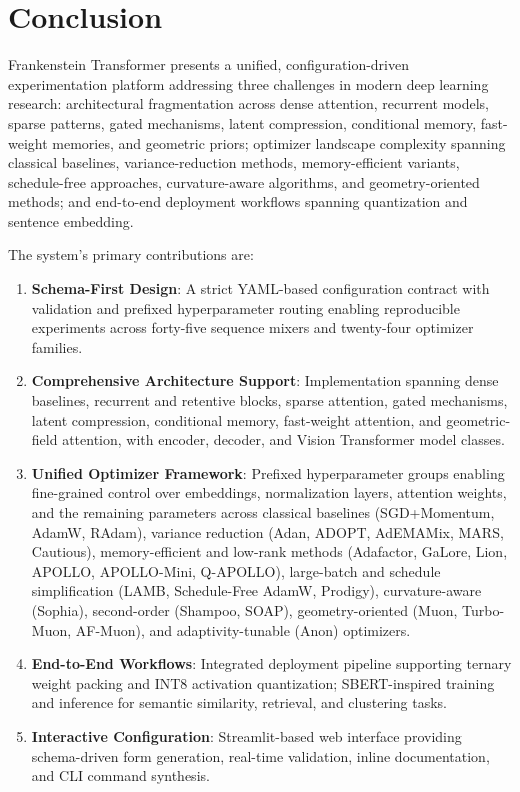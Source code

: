 \section{Conclusion}
\label{sec:conclusion}

Frankenstein Transformer presents a unified, configuration-driven experimentation platform addressing three challenges in modern deep learning research: architectural fragmentation across dense attention, recurrent models, sparse patterns, gated mechanisms, latent compression, conditional memory, fast-weight memories, and geometric priors; optimizer landscape complexity spanning classical baselines, variance-reduction methods, memory-efficient variants, schedule-free approaches, curvature-aware algorithms, and geometry-oriented methods; and end-to-end deployment workflows spanning quantization and sentence embedding.

The system's primary contributions are:
\begin{enumerate}[leftmargin=*]
    \item \textbf{Schema-First Design}: A strict YAML-based configuration contract with validation and prefixed hyperparameter routing enabling reproducible experiments across forty-five sequence mixers and twenty-four optimizer families.
    \item \textbf{Comprehensive Architecture Support}: Implementation spanning dense baselines, recurrent and retentive blocks, sparse attention, gated mechanisms, latent compression, conditional memory, fast-weight attention, and geometric-field attention, with encoder, decoder, and Vision Transformer model classes.
    \item \textbf{Unified Optimizer Framework}: Prefixed hyperparameter groups enabling fine-grained control over embeddings, normalization layers, attention weights, and the remaining parameters across classical baselines (SGD+Momentum, AdamW, RAdam), variance reduction (Adan, ADOPT, AdEMAMix, MARS, Cautious), memory-efficient and low-rank methods (Adafactor, GaLore, Lion, APOLLO, APOLLO-Mini, Q-APOLLO), large-batch and schedule simplification (LAMB, Schedule-Free AdamW, Prodigy), curvature-aware (Sophia), second-order (Shampoo, SOAP), geometry-oriented (Muon, Turbo-Muon, AF-Muon), and adaptivity-tunable (Anon) optimizers.
    \item \textbf{End-to-End Workflows}: Integrated deployment pipeline supporting ternary weight packing and INT8 activation quantization; SBERT-inspired training and inference for semantic similarity, retrieval, and clustering tasks.
    \item \textbf{Interactive Configuration}: Streamlit-based web interface providing schema-driven form generation, real-time validation, inline documentation, and CLI command synthesis.
\end{enumerate}

